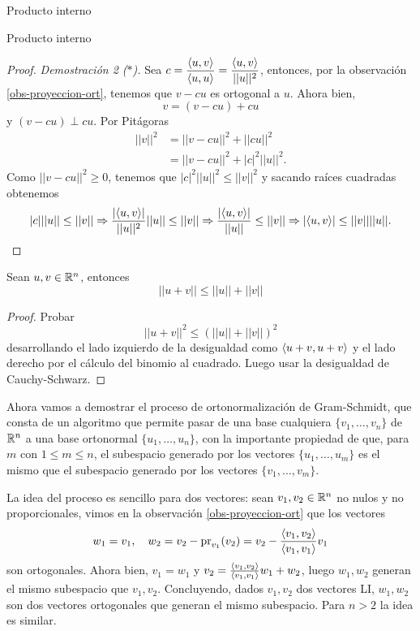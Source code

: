 \begin{chapter}{Producto interno}
\begin{section}{Producto interno}
\begin{proof}
            
        \textit{Demostración 2 ($*$).}
            Sea $c = \displaystyle\frac{\langle u,v\rangle}{\langle u,u\rangle} = \frac{\langle u,v\rangle}{||u||^2}$, entonces, por la observación \ref{obs-proyeccion-ort}, tenemos que  $ v-cu$ es ortogonal a $u$. Ahora bien, 
            \begin{equation*}
                v = (v - cu) + cu   
            \end{equation*}
            y  $(v - cu) \perp cu$. Por Pitágoras
            \begin{align*}
            ||v||^2 &= ||v-cu||^2 +||cu||^2  \\
            &=||v-cu||^2 +|c|^2||u||^2.
            \end{align*}
            Como $||v-cu||^2 \ge 0$, tenemos que $|c|^2||u||^2 \le 	||v||^2$ y sacando raíces cuadradas obtenemos
            $$
            |c|||u|| \le ||v|| \Rightarrow \frac{|\langle u,v\rangle|}{||u||^2}||u|| \le ||v|| \Rightarrow \frac{|\langle u,v\rangle|}{||u||}\le ||v|| \Rightarrow |\langle u,v\rangle|\le ||v||||u||.
            $$
        \end{proof}
        
        \begin{teorema} Sean $u, v\in \mathbb R^n$, entonces 
            $$||u + v|| \le ||u|| + ||v||	$$
        \end{teorema}
        \begin{proof}
            Probar 
            $$
            ||u + v||^2 \le (||u|| + ||v||)^2
            $$
            desarrollando  el lado izquierdo de la desigualdad  como $\langle u+v, u+v \rangle$ y el lado derecho por el cálculo del binomio al cuadrado. Luego usar la desigualdad de Cauchy-Schwarz.
        \end{proof}
        
        Ahora vamos a demostrar el proceso de ortonormalización de Gram-Schmidt, que consta de  un algoritmo que permite pasar de una base cualquiera $\{v_1,\ldots, v_n\}$ de $\mathbb R^n$ a una base ortonormal $\{u_1,\ldots, u_n\}$, con la importante propiedad de que, para $m$ con  $1 \le m \le n$, el subespacio generado por los vectores $\{u_1,\ldots, u_m\}$ es el mismo que el subespacio generado por los vectores $\{v_1,\ldots, v_m\}$.

        
        La idea del proceso es sencillo para dos vectores: sean  $v_1,v_2 \in \mathbb R^n$ no  nulos y no proporcionales, vimos en la observación \ref{obs-proyeccion-ort} que  los vectores
        \begin{equation*}
            w_1 = v_1, \quad w_2 = v_2 - \operatorname{pr}_{v_1}(v_2) = v_2 - \frac{\langle v_1,v_2\rangle}{\langle v_1,v_1\rangle}v_1
        \end{equation*}
        son ortogonales. Ahora bien, $v_1 = w_1$ y $v_2  = \frac{\langle v_1,v_2\rangle}{\langle v_1,v_1\rangle}w_1 + w_2$, luego  $w_1,w_2$ generan el mismo subespacio que $v_1,v_2$. Concluyendo, dados  $v_1,v_2$ dos vectores LI, $w_1,w_2$ son dos vectores ortogonales que generan el mismo subespacio. Para $n >2$ la idea es similar. 
        

\end{section}
\end{chapter}
